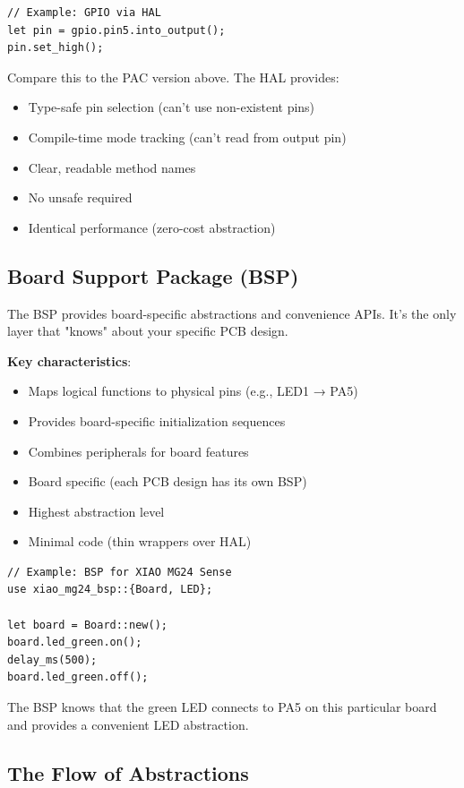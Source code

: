 \begin{verbatim}
// Example: GPIO via HAL
let pin = gpio.pin5.into_output();
pin.set_high();
\end{verbatim}

Compare this to the PAC version above. The HAL provides:
\begin{itemize}
    \item Type-safe pin selection (can't use non-existent pins)
    \item Compile-time mode tracking (can't read from output pin)
    \item Clear, readable method names
    \item No unsafe required
    \item Identical performance (zero-cost abstraction)
\end{itemize}

\subsection{Board Support Package (BSP)}
\label{subsec:bsp-layer}

The BSP provides board-specific abstractions and convenience APIs. It's the only layer that "knows" about your specific PCB design.

\textbf{Key characteristics}:
\begin{itemize}
    \item Maps logical functions to physical pins (e.g., LED1 → PA5)
    \item Provides board-specific initialization sequences
    \item Combines peripherals for board features
    \item Board specific (each PCB design has its own BSP)
    \item Highest abstraction level
    \item Minimal code (thin wrappers over HAL)
\end{itemize}

\begin{verbatim}
// Example: BSP for XIAO MG24 Sense
use xiao_mg24_bsp::{Board, LED};

let board = Board::new();
board.led_green.on();
delay_ms(500);
board.led_green.off();
\end{verbatim}

The BSP knows that the green LED connects to PA5 on this particular board and provides a convenient LED abstraction.

\subsection{The Flow of Abstractions}
\label{sec:abstraction-flow}

